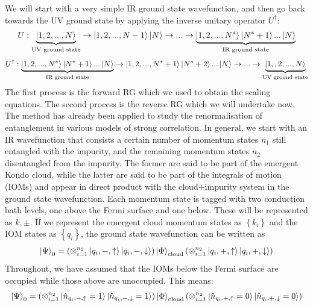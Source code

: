 \documentclass[prb]{revtex4-2}
\begin{document}
We will start with a very simple IR ground state wavefunction, and then go back towards the UV ground state by applying the inverse unitary operator \(U^\dagger\):
\begin{equation*}\begin{aligned}
	U : \underbrace{\ket{1,2,...,N}}_\text{UV ground state} \rightarrow \ket{1,2,...,N-1}\ket{N} \rightarrow ... \rightarrow \underbrace{\ket{1,2,...,N^*}\ket{N^*+1}...\ket{N}}_\text{IR ground state}
\end{aligned}\end{equation*}
\begin{equation*}\begin{aligned}
	U^\dagger : \underbrace{\ket{1,2,...,N^*}\ket{N^*+1}...\ket{N}}_\text{IR ground state} \rightarrow \ket{1,2,...,N^*+1}\ket{N^*+2}...\ket{N} \rightarrow ... \rightarrow\underbrace{\ket{1,,2,...,N}}_\text{UV ground state}
\end{aligned}\end{equation*}
The first process is the forward RG which we used to obtain the scaling equations.
The second process is the reverse RG which we will undertake now. The method has already been applied to study the renormalisation of entanglement in various models of strong correlation.
In general, we start with an IR wavefunction that consists a certain number of momentum states \(n_1\) still entangled with the impurity, and the remaining momentum states \(n_2\) disentangled from the impurity.
The former are said to be part of the emergent Kondo cloud, while the latter are said to be part of the integrals of motion (IOMs) and appear in direct product with the cloud+impurity system in the ground state wavefunction.
Each momentum state is tagged with two conduction bath levels, one above the Fermi surface and one below.
These will be represented as \(k,\pm\). If we represent the emergent cloud momentum states as \(\left\{k_i\right\} \) and the IOM states as \(\left\{q_i\right\}\), the ground state wavefunction can be written as 
\begin{equation}\begin{aligned}
	\ket{\Psi}_0 = \left(\otimes_{i=1}^{n_2}\ket{q_i,-,\uparrow}\ket{q_i,-,\downarrow}\right)\ket{\Phi}_\text{cloud}\left(\otimes_{i=1}^{n_2}\ket{q_i,+,\uparrow}\ket{q_i,+,\downarrow}\right)
\end{aligned}\end{equation}
Throughout, we have assumed that the IOMs below the Fermi surface are occupied while those above are unoccupied. This means:
\begin{equation}\begin{aligned}
	\ket{\Psi}_0 = \left(\otimes_{i=1}^{n_2}\ket{\hat n_{q_i,-,\uparrow}=1}\ket{\hat n_{q_i,-,\downarrow}=1}\right)\ket{\Phi}_\text{cloud}\left(\otimes_{i=1}^{n_2}\ket{\hat n_{q_i,+,\uparrow}=0}\ket{\hat n_{q_i,+,\downarrow}=0}\right)
\end{aligned}\end{equation}
\end{document}
